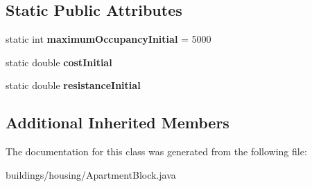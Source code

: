 \subsection*{Static Public Attributes}
\begin{DoxyCompactItemize}
\item 
static int {\bfseries maximum\+Occupancy\+Initial} = 5000\hypertarget{classbuildings_1_1housing_1_1_apartment_block_a2bea9f9428bfbb2bc3012508cc4320ba}{}\label{classbuildings_1_1housing_1_1_apartment_block_a2bea9f9428bfbb2bc3012508cc4320ba}

\item 
static double {\bfseries cost\+Initial}\hypertarget{classbuildings_1_1housing_1_1_apartment_block_aa33aeb3802205da55902f46d2977d0fd}{}\label{classbuildings_1_1housing_1_1_apartment_block_aa33aeb3802205da55902f46d2977d0fd}

\item 
static double {\bfseries resistance\+Initial}\hypertarget{classbuildings_1_1housing_1_1_apartment_block_a0cf61aa75b0ea7722f2c21a89f1d6532}{}\label{classbuildings_1_1housing_1_1_apartment_block_a0cf61aa75b0ea7722f2c21a89f1d6532}

\end{DoxyCompactItemize}
\subsection*{Additional Inherited Members}


The documentation for this class was generated from the following file\+:\begin{DoxyCompactItemize}
\item 
buildings/housing/Apartment\+Block.\+java\end{DoxyCompactItemize}
